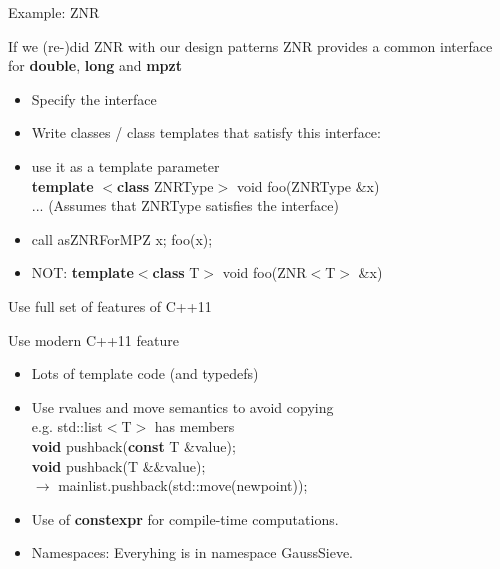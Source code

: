 \documentclass{beamer}
\begin{document}
\begin{frame}{Example: Z\textunderscore NR}
\begin{block}{If we (re-)did Z\textunderscore NR with our design patterns}
Z\textunderscore NR provides a common interface for \textbf{double}, \textbf{long} and \textbf{mpz\textunderscore t}
\begin{itemize}
 \item<2-> Specify the interface 
 \item<3-> Write classes / class templates that satisfy this interface:
 \item<5-> use it as a template parameter\\
 \textbf{template} $<$\textbf{class} ZNRType$>$ void foo(ZNRType \&x)\\
 ... (\alert<7->{Assumes that ZNRType satisfies the interface})
 \item<6-> call as\quad Z\textunderscore NRForMPZ x; foo(x);
 \item<6-> NOT: \textbf{template}$<$\textbf{class} T$>$ void foo(Z\textunderscore NR$<$T$>$ \&x)
\end{itemize}
\end{block}
\end{frame}

\begin{frame}{Use full set of features of C++11}
\begin{block}{Use modern C++11 feature}
\begin{itemize}
 \item Lots of template code (and typedefs)
 \item Use rvalues and move semantics to avoid copying\\
 e.g. std::list$<$T$>$ has members\\
 \textbf{void} push\textunderscore back(\textbf{const} T \&value);\\
 \textbf{void} push\textunderscore back(T \&\&value);\\
 $\longrightarrow$ main\textunderscore list.push\textunderscore back(std::move(new\textunderscore point));
 \item Use of \textbf{constexpr} for compile-time computations.
 \item Namespaces: Everyhing is in namespace GaussSieve.
\end{itemize}
\end{block}
\end{frame}
\end{document}
